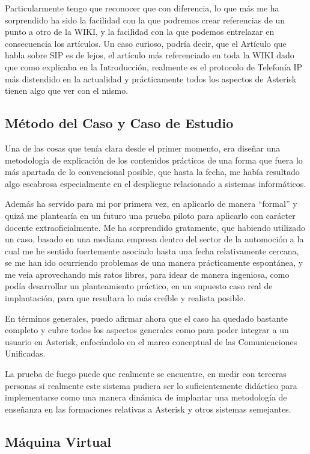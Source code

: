 Particularmente tengo que reconocer que con diferencia, lo que más me ha sorprendido ha sido la facilidad con la que podremos crear referencias de un punto a otro de la WIKI, y la facilidad con la que podemos entrelazar en consecuencia los artículos. Un caso curioso, podría decir, que el Artículo que habla sobre SIP es de lejos, el artículo más referenciado en toda la WIKI dado que como explicaba en la Introducción, realmente es el protocolo de Telefonía IP más distendido en la actualidad y prácticamente todos los aspectos de Asterisk tienen algo que ver con el mismo.

\subsection{Método del Caso y Caso de Estudio}

Una de las cosas que tenía clara desde el primer momento, era diseñar una metodología de explicación de los contenidos prácticos de una forma que fuera lo más apartada de lo convencional posible, que hasta la fecha, me había resultado algo escabrosa especialmente en el despliegue relacionado a sistemas informáticos.

Además ha servido para mi por primera vez, en aplicarlo de manera ``formal'' y quizá me plantearía en un futuro una prueba piloto para aplicarlo con carácter docente extraoficialmente. Me ha sorprendido gratamente, que habiendo utilizado un caso, basado en una mediana empresa dentro del sector de la automoción a la cual me he sentido fuertemente asociado hasta una fecha relativamente cercana, se me han ido ocurriendo problemas de una manera prácticamente espontánea, y me veía aprovechando mis ratos libres, para idear de manera ingeniosa, como podía desarrollar un planteamiento práctico, en un supuesto caso real de implantación, para que resultara lo más creíble y realista posible.

En términos generales, puedo afirmar ahora que el caso ha quedado bastante completo y cubre todos los aspectos generales como para poder integrar a un usuario en Asterisk, enfocándolo en el marco conceptual de las Comunicaciones Unificadas.

La prueba de fuego puede que realmente se encuentre, en medir con terceras personas si realmente este sistema pudiera ser lo suficientemente didáctico para implementarse como una manera dinámica de implantar una metodología de enseñanza en las formaciones relativas a Asterisk y otros sistemas semejantes.

\subsection{Máquina Virtual}

